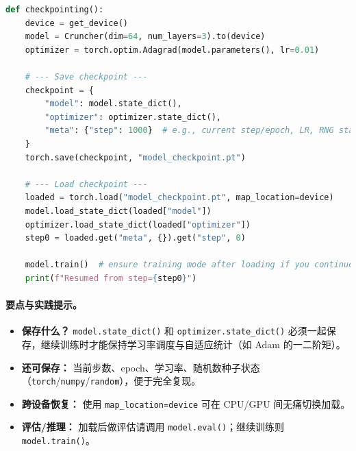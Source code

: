 \begin{lstlisting}[language=Python]
def checkpointing():
    device = get_device()
    model = Cruncher(dim=64, num_layers=3).to(device)
    optimizer = torch.optim.Adagrad(model.parameters(), lr=0.01)

    # --- Save checkpoint ---
    checkpoint = {
        "model": model.state_dict(),
        "optimizer": optimizer.state_dict(),
        "meta": {"step": 1000}  # e.g., current step/epoch, LR, RNG state...
    }
    torch.save(checkpoint, "model_checkpoint.pt")

    # --- Load checkpoint ---
    loaded = torch.load("model_checkpoint.pt", map_location=device)
    model.load_state_dict(loaded["model"])
    optimizer.load_state_dict(loaded["optimizer"])
    step0 = loaded.get("meta", {}).get("step", 0)

    model.train()  # ensure training mode after loading if you continue training
    print(f"Resumed from step={step0}")
\end{lstlisting}

\paragraph{要点与实践提示。}
\begin{itemize}
  \item \textbf{保存什么？} \texttt{model.state\_dict()} 和 \texttt{optimizer.state\_dict()} 必须一起保存，继续训练时才能保持学习率调度与自适应统计（如 Adam 的一二阶矩）。
  \item \textbf{还可保存：} 当前步数、epoch、学习率、随机数种子状态（\texttt{torch}/\texttt{numpy}/\texttt{random}），便于完全复现。
  \item \textbf{跨设备恢复：} 使用 \texttt{map\_location=device} 可在 CPU/GPU 间无痛切换加载。
  \item \textbf{评估/推理：} 加载后做评估请调用 \texttt{model.eval()}；继续训练则 \texttt{model.train()}。
\end{itemize}

